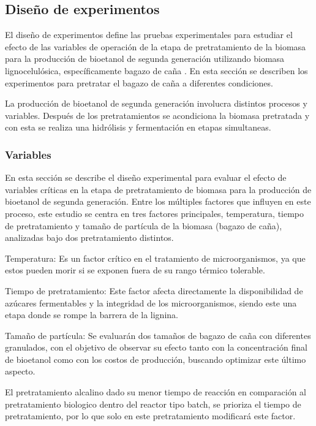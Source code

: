 \documentclass[12pt]{article}
\begin{document}
	
	
	\subsection{Diseño de experimentos}
	
	El diseño de experimentos define las pruebas experimentales para estudiar el efecto de las variables de operación de la etapa de pretratamiento de la biomasa para la producción de bioetanol de segunda generación utilizando biomasa lignocelulósica, específicamente bagazo de caña . En esta sección se describen los experimentos para pretratar el bagazo de caña a diferentes condiciones.
	
	La producción de bioetanol de segunda generación involucra distintos procesos y variables. Después de los pretratamientos se acondiciona la biomasa pretratada y con esta se realiza una hidrólisis y fermentación en etapas simultaneas.
	
 		\subsubsection{Variables}
		\label{variables}
		
En esta sección se describe el diseño experimental para evaluar el efecto de variables críticas en la etapa de pretratamiento de biomasa para la producción de bioetanol de segunda generación. Entre los múltiples factores que influyen en este proceso, este estudio se centra en tres factores principales, temperatura, tiempo de pretratamiento y tamaño de partícula de la biomasa (bagazo de caña), analizadas bajo dos pretratamiento distintos.

Temperatura: Es un factor crítico en el tratamiento de microorganismos, ya que estos pueden morir si se exponen fuera de su rango térmico tolerable. 

Tiempo de pretratamiento: Este factor afecta directamente la disponibilidad de azúcares fermentables y la integridad de los microorganismos, siendo este una etapa donde se rompe la barrera de la lignina.

Tamaño de partícula: Se evaluarán dos tamaños de bagazo de caña con diferentes granulados, con el objetivo de observar su efecto tanto con la concentración final de bioetanol como con los costos de producción, buscando optimizar este último aspecto.

El pretratamiento alcalino dado su menor tiempo de reacción en comparación al pretratamiento biologico dentro del reactor tipo batch, se prioriza el tiempo de pretratamiento, por lo que solo en este pretratamiento modificará este factor.
\end{document}
